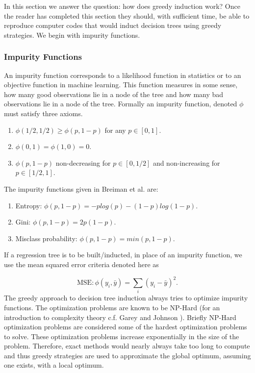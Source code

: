 In this section we answer the question: how does greedy induction work? Once the reader has completed this section they should, with sufficient time, be able to reproduce computer codes that would induct decision trees using greedy strategies. We begin with impurity functions. 

\subsubsection{Impurity Functions}

An impurity function corresponds to a likelihood function in statistics or to an objective function in machine learning. This function measures in some sense, how many good observations lie in a node of the tree and how many bad observations lie in a node of the tree. Formally an impurity function, denoted $\phi$ must satisfy three axioms. 

\begin{enumerate}
\item $\phi(1/2,1/2) \geq \phi(p, 1-p)$ for any $p\in[0,1]$. 
\item $\phi(0,1)=\phi(1,0)=0$. 
\item $ \phi(p, 1-p)$ non-decreasing for $p\in[0,1/2]$ and non-increasing for $p\in[1/2,1]$. 
\end{enumerate}

The impurity functions given in Breiman et al. \cite{breiman1984classification} are: 
\begin{enumerate}
\item Entropy: $\phi(p,1-p)= -plog(p) -(1-p)log(1-p)$.
\item Gini: $\phi(p, 1-p)=2p(1-p)$.
\item Misclass probability: $\phi(p, 1-p)=min(p,1-p).$
\end{enumerate}
If a regression tree is to be built/inducted, in place of an impurity function, we use the mean squared error criteria denoted here as  

$$\text{MSE}: \phi(y_i, \bar{y})=\sum_i(y_i-\bar{y})^2.$$
The greedy approach to decision tree induction always tries to optimize impurity functions. The optimization problems are known to be NP-Hard (for an introduction to complexity theory c.f. Garey and Johnson \cite{garey1979computers}). Briefly NP-Hard optimization problems are considered some of the hardest optimization problems to solve. These optimization problems increase exponentially in the size of the problem. Therefore, exact methods would nearly always take too long to compute and thus greedy strategies are used to approximate the global optimum, assuming one exists, with a local optimum. 

